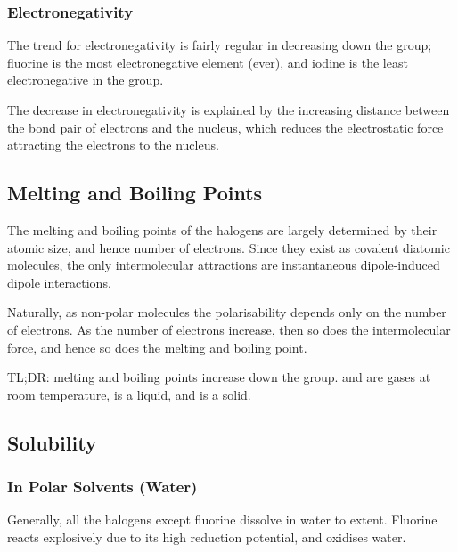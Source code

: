 

			\subsubsection{Electronegativity}

				The trend for electronegativity is fairly regular in decreasing down the group; fluorine is the most electronegative element
				(ever), and iodine is the least electronegative in the group.

				The decrease in electronegativity is explained by the increasing distance between the bond pair of electrons and the nucleus,
				which reduces the electrostatic force attracting the electrons to the nucleus.




		\subsection{Melting and Boiling Points}

			The melting and boiling points of the halogens are largely determined by their atomic size, and hence number of electrons. Since
			they exist as covalent diatomic molecules, the only intermolecular attractions are instantaneous dipole-induced dipole interactions.

			Naturally, as non-polar molecules the polarisability depends only on the number of electrons. As the number of electrons increase,
			then so does the intermolecular force, and hence so does the melting and boiling point.

			TL;DR: melting and boiling points increase down the group.  and  are gases at room temperature,  is a
			liquid, and  is a solid.



		\subsection{Solubility}

			\subsubsection{In Polar Solvents (Water)}

				Generally, all the halogens except fluorine dissolve in water to  extent. Fluorine reacts explosively due to its high
				reduction potential, and oxidises water.

